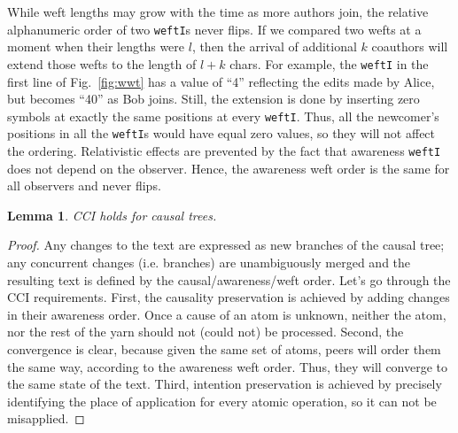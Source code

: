 \documentclass{sig-alternate}
\newtheorem{lemma}{Lemma}
\begin{document}
While weft lengths may grow with the time as more authors join, the relative alphanumeric order of two {\tt weftI}s never flips.
If we compared two wefts at a moment when their lengths were $l$, then the arrival of additional $k$ coauthors will extend those wefts to the length of $l+k$ chars.
For example, the {\tt weftI} in the first line of Fig.~\ref{fig:wwt} has a value of ``4'' reflecting the edits made by Alice, but becomes ``40'' as Bob joins.
Still, the extension is done by inserting zero symbols at exactly the same positions at every {\tt weftI}. %
Thus, all the newcomer's positions in all the {\tt weftI}s would have equal zero values, so they will not affect the ordering.
Relativistic effects are prevented by the fact that awareness {\tt weftI} does not depend on the observer.
Hence, the awareness weft order is the same for all observers and never flips.

\begin{lemma} 
CCI holds for causal trees. \label{lemma:cci}
\end{lemma}
\begin{proof} 
Any changes to the text are expressed as new branches  of the causal tree; any concurrent changes (i.e. branches) are unambiguously merged and the resulting text is defined by the causal/awareness/weft order.
Let's go through the CCI requirements.
First, the causality preservation is achieved by adding changes in their awareness order. Once a cause of an atom is unknown, neither the atom, nor the rest of the yarn should not (could not) be processed.
Second, the convergence is clear, because given the same set of atoms, peers will order them the same way, according to the awareness weft order. Thus, they will converge to the same state of the text.
Third, intention preservation is achieved by precisely identifying the place of application for every atomic operation, so it can not be misapplied.
\end{proof}
\end{document}
